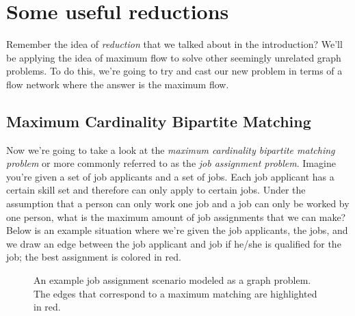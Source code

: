 \documentclass[11pt]{article}
\theoremstyle{plain}
\theoremstyle{definition}
\begin{document}
\section{Some useful reductions}
Remember the idea of \emph{reduction} that we talked about in the introduction? We'll be applying the idea of maximum flow to solve other seemingly unrelated graph problems. To do this, we're going to try and cast our new problem in terms of a flow network where the answer is the maximum flow.
\subsection{Maximum Cardinality Bipartite Matching}
Now we're going to take a look at the \emph{maximum cardinality bipartite matching problem} or more commonly referred to as the \emph{job assignment problem}. Imagine you're given a set of job applicants and a set of jobs. Each job applicant has a certain skill set and therefore can only apply to certain jobs. Under the assumption that a person can only work one job and a job can only be worked by one person, what is the maximum amount of job assignments that we can make? Below is an example situation where we're given the job applicants, the jobs, and we draw an edge between the job applicant and job if he/she is qualified for the job; the best assignment is colored in red.
\begin{figure}[!ht]
\centering
\caption{An example job assignment scenario modeled as a graph problem. The edges that correspond to a maximum matching are highlighted in red.}
\end{figure}
\end{document}
